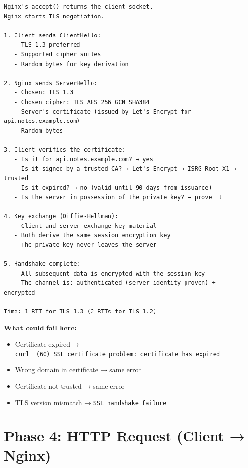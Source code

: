 \begin{outputbox}
\begin{Verbatim}[fontsize=\codesize, breaklines, breakanywhere, breaksymbolleft={\tiny\textcolor{muted}{$\hookrightarrow$}}]
Nginx's accept() returns the client socket.
Nginx starts TLS negotiation.

1. Client sends ClientHello:
   - TLS 1.3 preferred
   - Supported cipher suites
   - Random bytes for key derivation

2. Nginx sends ServerHello:
   - Chosen: TLS 1.3
   - Chosen cipher: TLS_AES_256_GCM_SHA384
   - Server's certificate (issued by Let's Encrypt for api.notes.example.com)
   - Random bytes

3. Client verifies the certificate:
   - Is it for api.notes.example.com? → yes
   - Is it signed by a trusted CA? → Let's Encrypt → ISRG Root X1 → trusted
   - Is it expired? → no (valid until 90 days from issuance)
   - Is the server in possession of the private key? → prove it

4. Key exchange (Diffie-Hellman):
   - Client and server exchange key material
   - Both derive the same session encryption key
   - The private key never leaves the server

5. Handshake complete:
   - All subsequent data is encrypted with the session key
   - The channel is: authenticated (server identity proven) + encrypted

Time: 1 RTT for TLS 1.3 (2 RTTs for TLS 1.2)
\end{Verbatim}
\end{outputbox}

\noindent{}\textbf{What could fail here:}

\begin{itemize}
\tightlist
\item
  Certificate expired → \texttt{curl:}\allowbreak{}\texttt{\ (60)\ SSL\ certificate\ problem:}\allowbreak{}\texttt{\ certificate\ has\ expired}
\item
  Wrong domain in certificate → same error
\item
  Certificate not trusted → same error
\item
  TLS version mismatch → \texttt{SSL\ handshake\ failure}
\end{itemize}

\setcounter{section}{4}
\section{Phase 4: HTTP Request (Client → Nginx)}\label{29-client-server-journey:295-phase-4-http-request-client--nginx}

